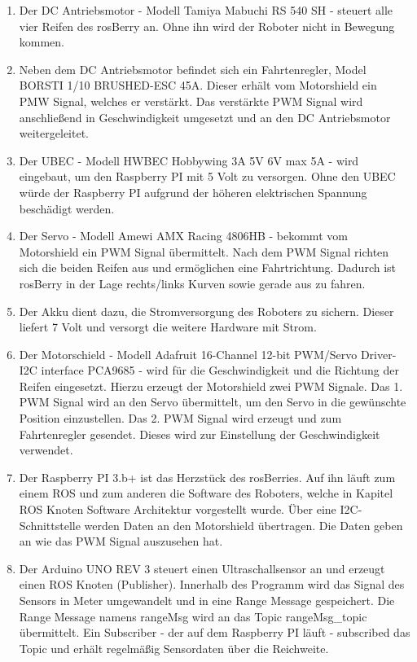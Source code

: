 \documentclass[conference]{IEEEtran}
\begin{document}
	\begin{enumerate}
		\item Der DC Antriebsmotor - Modell Tamiya Mabuchi RS 540 SH - steuert alle vier Reifen des rosBerry an. Ohne ihn wird der Roboter nicht in Bewegung kommen.
		\item Neben dem DC Antriebsmotor befindet sich ein Fahrtenregler, Model BORSTI 1/10 BRUSHED-ESC 45A. Dieser erhält vom Motorshield ein PMW Signal, welches er verstärkt. Das verstärkte PWM Signal wird anschließend in Geschwindigkeit umgesetzt und an den DC Antriebsmotor weitergeleitet.
		\item Der UBEC - Modell HWBEC Hobbywing 3A 5V 6V max 5A - wird eingebaut, um den Raspberry PI mit 5 Volt zu versorgen. Ohne den UBEC würde der Raspberry PI aufgrund der höheren elektrischen Spannung beschädigt werden.
		\item Der Servo - Modell Amewi AMX Racing 4806HB - bekommt vom Motorshield ein PWM Signal übermittelt. Nach dem PWM Signal richten sich die beiden Reifen aus und ermöglichen eine Fahrtrichtung. Dadurch ist rosBerry in der Lage rechts/links Kurven sowie gerade aus zu fahren.
		\item Der Akku dient dazu, die Stromversorgung des Roboters zu sichern. Dieser liefert 7 Volt und versorgt die weitere Hardware mit Strom.
		\item Der Motorschield - Modell Adafruit 16-Channel 12-bit PWM/Servo Driver-I2C interface PCA9685 - wird für die Geschwindigkeit und die Richtung der Reifen eingesetzt. Hierzu erzeugt der Motorshield zwei PWM Signale. Das 1. PWM Signal wird an den Servo übermittelt, um den Servo in die gewünschte Position einzustellen. Das 2. PWM Signal wird erzeugt und zum Fahrtenregler gesendet. Dieses wird zur Einstellung der Geschwindigkeit verwendet.
		\item Der Raspberry PI 3.b+ ist das Herzstück des rosBerries. Auf ihn läuft zum einem ROS und zum anderen die Software des Roboters, welche in Kapitel ROS Knoten Software Architektur vorgestellt wurde. 
		Über eine I2C-Schnittstelle werden Daten an den Motorshield übertragen. Die Daten geben an wie das PWM Signal auszusehen hat.
		\item Der Arduino UNO REV 3 steuert einen Ultraschallsensor an und erzeugt einen ROS Knoten (Publisher).
		Innerhalb des Programm wird das Signal des Sensors in Meter umgewandelt und in eine Range Message gespeichert. Die Range Message namens rangeMsg wird an das Topic rangeMsg\_topic übermittelt. Ein Subscriber - der auf dem Raspberry PI läuft - subscribed das Topic und erhält regelmäßig Sensordaten über die Reichweite.
		

\end{enumerate}
\end{document}
